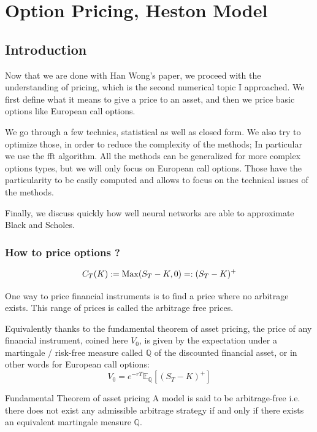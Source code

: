 \chapter{Option Pricing, Heston Model}
\label{chapteroptionpricing}
\section{Introduction}

Now that we are done with Han Wong's paper, we proceed with the understanding of pricing, which is the second numerical topic I approached. We first define what it means to give a price to an asset, and then we price basic options like European call options. 

We go through a few technics, statistical as well as closed form. We also try to optimize those, in order to reduce the complexity of the methods; In particular we use the fft algorithm. All the methods can be generalized for more complex options types, but we will only focus on European call options. Those have the particularity to be easily computed and allows to focus on the technical issues of the methods.

Finally, we discuss quickly how well neural networks are able to approximate Black and Scholes.

\subsection{How to price options ?}

\begin{definition}
$$C_T(K) :=  \operatorname*{Max} (S_T - K, 0) =: (S_T - K)^+   $$
\end{definition}

One way to price financial instruments is to find a price where no arbitrage exists. This range of prices is called the arbitrage free prices. 

Equivalently thanks to the fundamental theorem of asset pricing, the price of any financial instrument, coined here $V_0$, is given by the expectation under a martingale / risk-free measure called $\mathbb Q$ of the discounted financial asset, or in other words for European call options:
$$V_0 = e^{-r T}  \mathbb E_{\mathbb Q} [ (S_T - K)^+ ] $$


\begin{theoreme}{Fundamental Theorem of asset pricing}
A model is said to be arbitrage-free i.e. there does not exist any admissible arbitrage strategy if and only if there exists an equivalent martingale measure $\mathbb Q$.
\end{theoreme}


